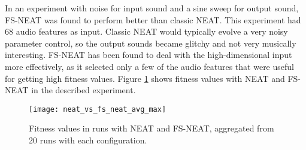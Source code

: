In an experiment with noise for input sound and a sine sweep for output sound, FS-NEAT was found to perform better than classic NEAT. This experiment had 68 audio features as input. Classic NEAT would typically evolve a very noisy parameter control, so the output sounds became glitchy and not very musically interesting. FS-NEAT has been found to deal with the high-dimensional input more effectively, as it selected only a few of the audio features that were useful for getting high fitness values. Figure \ref{fig:neat_vs_fs_neat_avg_max} shows fitness values with NEAT and FS-NEAT in the described experiment.

\begin{figure}[H]
    \centering
    \texttt{[image: neat\_vs\_fs\_neat\_avg\_max]}
    \caption{Fitness values in runs with NEAT and FS-NEAT, aggregated from 20 runs with each configuration.}
    \label{fig:neat_vs_fs_neat_avg_max}
\end{figure}



